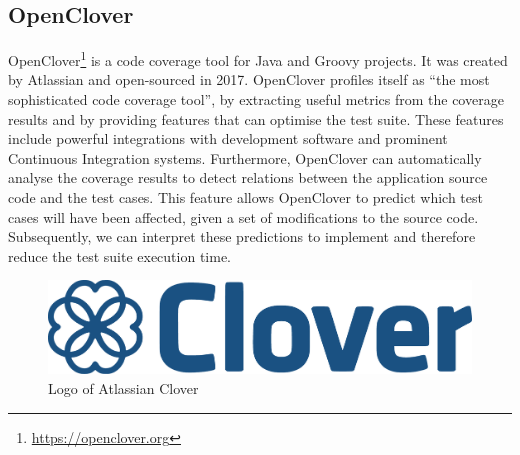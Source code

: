 
\subsection{OpenClover}
OpenClover\footnote{\url{https://openclover.org}} is a code coverage tool for Java and Groovy projects. It was created by Atlassian and open-sourced in 2017. OpenClover profiles itself as ``the most sophisticated code coverage tool'', by extracting useful metrics from the coverage results and by providing features that can optimise the test suite. These features include powerful integrations with development software and prominent Continuous Integration systems. Furthermore, OpenClover can automatically analyse the coverage results to detect relations between the application source code and the test cases. This feature allows OpenClover to predict which test cases will have been affected, given a set of modifications to the source code. Subsequently, we can interpret these predictions to implement \tcs{} and therefore reduce the test suite execution time.

\begin{figure}[htbp!]
	\centering
	\includegraphics[height=0.05\textheight]{assets/images/clover.pdf}
	\caption{Logo of Atlassian Clover}
\end{figure}